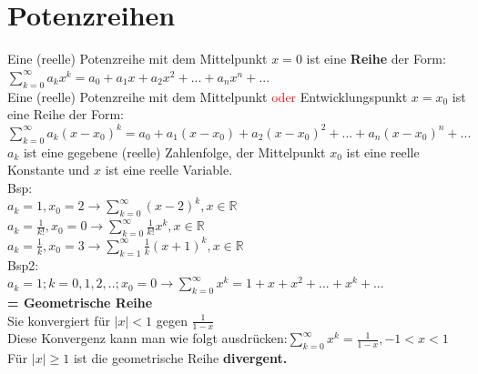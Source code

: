 \documentclass[12pt,a4paper]{article}
\begin{document}
\section{Potenzreihen}
Eine (reelle) Potenzreihe mit dem Mittelpunkt $x=0$ ist eine \textbf{Reihe} der Form:\\$\sum\limits_{k=0}^{\infty}a_kx^k=a_0+a_1x+a_2x^2+...+a_nx^n+...$\\
Eine (reelle) Potenzreihe mit dem Mittelpunkt \textcolor{red}{oder} Entwicklungspunkt $x=x_0$ ist eine Reihe der Form:\\$\sum\limits_{k=0}^{\infty}a_k(x-x_0)^k=a_0+a_1(x-x_0)+a_2(x-x_0)^2+...+a_n(x-x_0)^n+...$\\
$a_k$ ist eine gegebene (reelle) Zahlenfolge, der Mittelpunkt $x_0$ ist eine reelle Konstante und $x$ ist eine reelle Variable.\\
Bsp:\\
$a_k=1,x_0=2\rightarrow\sum\limits_{k=0}^{\infty}(x-2)^k,x\in\mathbb{R}$\\
$a_k=\frac{1}{k!},x_0=0\rightarrow\sum\limits_{k=0}^{\infty}\frac{1}{k!}x^k,x\in\mathbb{R}$\\
$a_k=\frac{1}{k},x_0=3\rightarrow\sum\limits_{k=1}^{\infty}\frac{1}{k}(x+1)^k,x\in\mathbb{R}$\\
Bsp2:\\
$a_k=1;k=0,1,2,..;x_0=0\rightarrow\sum\limits_{k=0}^{\infty}x^k=1+x+x^2+...+x^k+...$\\\textbf{= Geometrische Reihe}\\
Sie konvergiert für $|x|<1$ gegen $\frac{1}{1-x}$\\
Diese Konvergenz kann man wie folgt ausdrücken:$\sum\limits_{k=0}^{\infty}x^k=\frac{1}{1-x},-1<x<1$\\
Für $|x|\geq 1$ ist die geometrische Reihe \textbf{divergent.}
\end{document}
